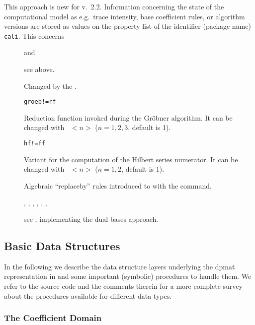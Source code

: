 This approach is new for v.~2.2. Information concerning the state of
the computational model as e.g.\ trace intensity, base coefficient
rules, or algorithm versions are stored as values on the property list
of the identifier (package name) \texttt{cali}. This concerns
\begin{description}
\item[] and 

  see above.

\item[]

  Changed by the .

\item[]\texttt{groeb!=rf}

  Reduction function invoked during the Gr\"obner algorithm. It can be
changed with \ $<n>$ ($n=1,2,3$, default is 1).

\item[]\texttt{hf!=ff}

  Variant for the computation of the Hilbert series numerator. It
can be changed with \ $<n>$ ($n=1,2$, default is 1).

\item[]

  Algebraic ``replaceby'' rules introduced to  with the
 command.

\item[], , , ,
, , 

see , implementing the dual bases approach.
\end{description}


\subsection{Basic Data Structures}

In the following we describe the data structure layers underlying the
dpmat representation in  and some important (symbolic) procedures
to handle them. We refer to the source code and the comments therein for
a more complete survey about the procedures available for different
data types.

\subsubsection{The Coefficient Domain}

